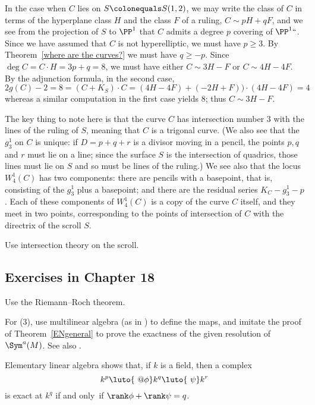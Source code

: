 In the case when $C$ lies on $S \colonequals  S(1,2)$, we may write
the class of $C$ in terms of the hyperplane class $H$ and the class $F$
of a ruling, $C\sim pH+qF$, and we see from the
projection of $S$ to $\PP^1$ that $C$ admits
a degree $p$ covering of $\PP^1` `$. Since we have assumed that $C$
is not hyperelliptic,
we must have $p\geq 3$. By Theorem~\ref{where are the curves?} we
must have
$q\geq -p$. Since $\deg C = C\cdot H = 3p+q = 8$, we must have either
$C\sim 3H-F$ or $C\sim 4H-4F$. By the adjunction formula, in the second
case,
$$
2g(C)-2 = 8 = (C+K_S)\cdot C = (4H-4F)+(-2H+F))\cdot(4H-4F) =4
$$
whereas a similar computation in the first case yields 8; thus $C\sim
3H-F$.

The key thing to note here is that the curve $C$ has intersection number
3 with the lines of the ruling of $S$, meaning that $C$ is a trigonal
curve. (We also see that the $g^1_3$ on $C$ is unique: if $D = p +
q + r$ is a divisor moving in a pencil, the points $p, q$ and $r$ must
lie on a line; since the surface $S$ is the intersection of quadrics,
those lines must lie on $S$ and so must be  lines  of the ruling.) We
see also that the locus $W^1_4(C)$ has two components: there are pencils
with a basepoint, that is, consisting of the $g^1_3$ plus a basepoint;
and there are the residual series $K_C - g^1_3 - p$. Each of these
components of $W^1_4(C)$ is a copy of the curve $C$ itself, and they
meet in two points, corresponding to the points of intersection of $C$
with the directrix of the scroll $S$.

Use intersection theory on the scroll.
%

\subsection*{Exercises in Chapter 18\nopunct}

Use the Riemann--Roch theorem.

For (3), use multilinear algebra (as in \cite{Eisenbud1995}) to define the
maps, and imitate the proof of Theorem~\ref{ENgeneral} to prove
the exactness of the given resolution of $\Sym^a(M)$. See also
%
\cite[Appendix A2.6]{Eisenbud1995}.

Elementary linear algebra shows that, if $k$ is a field, then a
complex 
$$k^p \luto{\ @\phi} k^q \luto{\ \psi} k^r$$ 
is exact at $k^q$ if and
only~if $\rank \phi +\rank \psi = q$.

